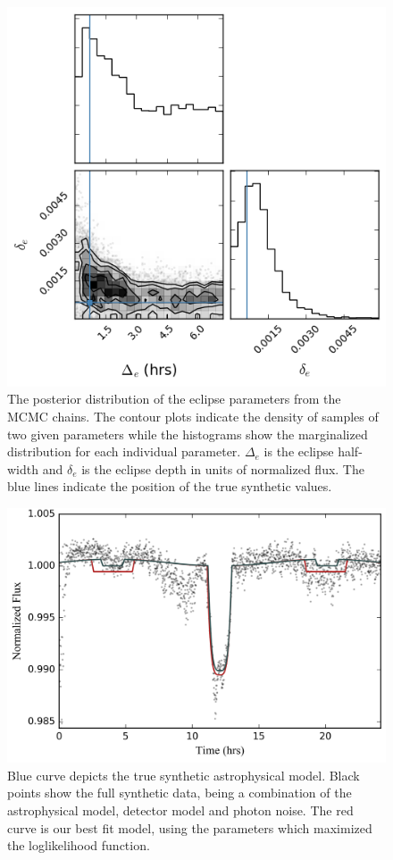 \documentclass[twocolumn]{aastex61}
\begin{document}
\begin{figure}[b]
  \includegraphics[width=\columnwidth]{figs/results/eclipse/eclipse_corner.png}
  \caption{\small The posterior distribution of the eclipse parameters from the MCMC chains. The contour plots indicate the density of samples of two given parameters while the histograms show the marginalized distribution for each individual parameter. $\Delta_{e}$ is the eclipse half-width and $\delta_{e}$ is the eclipse depth in units of normalized flux. The blue lines indicate the position of the true synthetic values.}
  \label{fig:eclCorner}
\end{figure}

\begin{figure}
  \includegraphics[width=\columnwidth]{figs/results/finalLC.png}
  \caption{Blue curve depicts the true synthetic astrophysical model. Black points show the full synthetic data, being a combination of the astrophysical model, detector model and photon noise. The red curve is our best fit model, using the parameters which maximized the loglikelihood function.}
  \label{fig:finalLC}
\end{figure}
\end{document}

